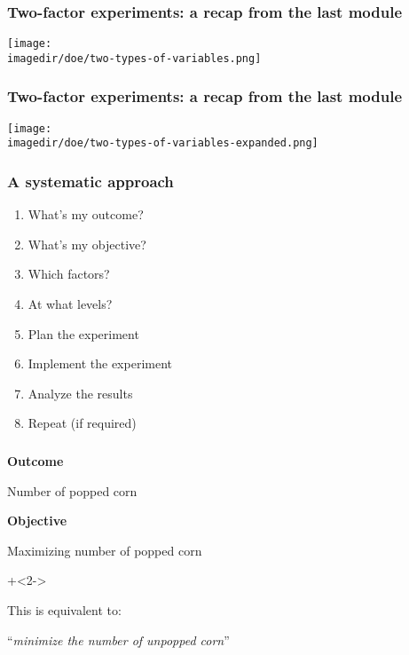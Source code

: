\begin{frame}\frametitle{Two-factor experiments: a recap from the last module}
    \texttt{[image: \\imagedir/doe/two-types-of-variables.png]}
\end{frame}

\begin{frame}\frametitle{Two-factor experiments: a recap from the last module}
    \texttt{[image: \\imagedir/doe/two-types-of-variables-expanded.png]}
\end{frame}

{
\begin{frame}\frametitle{}
	\vspace{-5cm}
\end{frame}}

\begin{frame}\frametitle{A systematic approach}
	 \begin{enumerate}
	 	\item	What's my outcome? \pause
	 	\item	What's my objective? \pause
	 	\item	Which factors? \pause
		\item	At what levels?\pause
	 	\item	Plan the experiment \pause
	 	\item	Implement the experiment\pause
	 	\item	Analyze the results\pause
		\item	Repeat (if required)
	 \end{enumerate}
	 \vspace{5cm}
\end{frame}

{
\begin{frame}\frametitle{}
	
	{\color{white}
		\textbf{Outcome}
		
		\qquad Number of popped corn
		
		\vspace{18pt}
		
		\textbf{Objective}
		
		\qquad Maximizing number of popped corn
	

		\vspace{12pt}
		\onslide+<2->{
			This is equivalent to:

			``\emph{minimize the number of unpopped corn}''
		}

	}
	\vspace{4cm}
\end{frame}}


